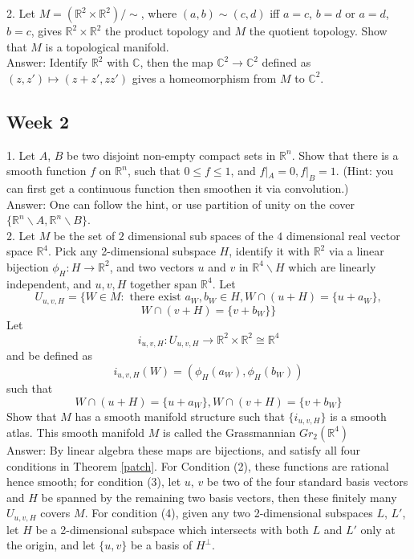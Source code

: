 \documentclass{article}
\theoremstyle{definition}
\begin{document}
2. Let $M=(\mathbb{R}^2\times\mathbb{R}^2)/\sim$, where $(a, b)\sim (c, d)$ iff $a=c$, $b=d$ or $a=d$, $b=c$, gives $\mathbb{R}^2\times\mathbb{R}^2$ the product topology and $M$ the quotient topology. Show that $M$ is a topological manifold.\\

Answer: Identify $\mathbb{R}^2$ with $\mathbb{C}$, then the map $\mathbb{C}^2\rightarrow \mathbb{C}^2$ defined as $(z, z')\mapsto (z+z', zz')$ gives a homeomorphism from $M$ to $\mathbb{C}^2$.

\subsection{Week 2}

1. Let $A$, $B$ be two disjoint non-empty compact sets in $\mathbb{R}^n$. Show that there is a smooth function $f$ on $\mathbb{R}^n$, such that $0\leq f\leq 1$, and $f|_A=0, f|_B=1$. (Hint: you can first get a continuous function then smoothen it via convolution.)\\

Answer: One can follow the hint, or use partition of unity on the cover $\{\mathbb{R}^n\backslash A, \mathbb{R}^n\backslash B\}$.\\

2. Let $M$ be the set of $2$ dimensional sub spaces of the $4$ dimensional real vector space $\mathbb{R}^4$. Pick any 2-dimensional subspace $H$, identify it with $\mathbb{R}^2$ via a linear bijection $\phi_H: H\rightarrow \mathbb{R}^2$, and two vectors $u$ and $v$ in $\mathbb{R}^4\backslash H$ which are linearly independent, and $u, v, H$ together span $\mathbb{R}^4$. Let 
\[U_{u, v, H}=\{W\in M: \text{ there exist }a_W, b_W\in H, W\cap (u+H)=\{u+a_W\},\]
\[W\cap (v+H)=\{v+b_W\}\}\]
Let 
\[i_{u, v, H}: U_{u, v, H}\rightarrow \mathbb{R}^2\times \mathbb{R}^2\cong\mathbb{R}^4\]
and be defined as 
\[i_{u, v, H}(W)=(\phi_H(a_W), \phi_H(b_W))\]
such that
\[W\cap (u+H)=\{u+a_W\}, W\cap (v+H)=\{v+b_W\}\]
Show that $M$ has a smooth manifold structure such that $\{i_{u, v, H}\}$ is a smooth atlas. This smooth manifold $M$ is called the Grassmannian $Gr_2(\mathbb{R}^4)$\\

Answer: By linear algebra these maps are bijections, and satisfy all four conditions in Theorem \ref{patch}. For Condition (2), these functions are rational hence smooth; for condition (3), let $u$, $v$ be two of the four standard basis vectors and $H$ be spanned by the remaining two basis vectors, then these finitely many $U_{u, v, H}$ covers $M$. For condition (4), given any two 2-dimensional subspaces $L$, $L'$, let $H$ be a 2-dimensional subspace which intersects with both $L$ and $L'$ only at the origin, and let $\{u, v\}$ be a basis of $H^\perp$.
\end{document}
